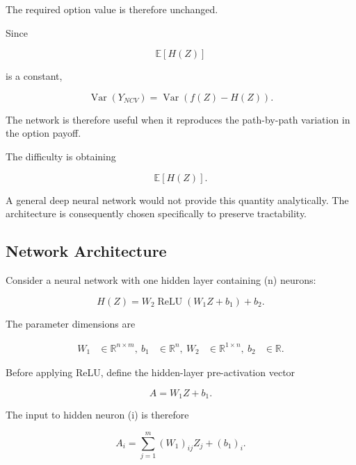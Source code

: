 \documentclass[12pt,a4paper]{report}
\begin{document}
The required option value is therefore unchanged.

Since

\begin{equation}
\mathbb{E}[H(Z)]
\end{equation}

is a constant,

\begin{equation}
\operatorname{Var}(Y_{NCV})
=
\operatorname{Var}
\left(
f(Z)-H(Z)
\right).
\end{equation}

The network is therefore useful when it reproduces the path-by-path variation in the option payoff.

The difficulty is obtaining

\begin{equation}
\mathbb{E}[H(Z)].
\end{equation}

A general deep neural network would not provide this quantity analytically. The architecture is consequently chosen specifically to preserve tractability.

\subsection{Network Architecture}

Consider a neural network with one hidden layer containing (n) neurons:

\begin{equation}
H(Z)
=
W_2
\operatorname{ReLU}
(W_1Z+b_1)
+
b_2.
\end{equation}

The parameter dimensions are

\begin{align}
W_1 &\in \mathbb{R}^{n\times m},\
b_1 &\in \mathbb{R}^{n},\
W_2 &\in \mathbb{R}^{1\times n},\
b_2 &\in \mathbb{R}.
\end{align}

Before applying ReLU, define the hidden-layer pre-activation vector

\begin{equation}
A
=
W_1Z+b_1.
\end{equation}

The input to hidden neuron (i) is therefore

\begin{equation}
A_i
=
\sum_{j=1}^{m}
(W_1)_{ij}Z_j
+
(b_1)_i.
\end{equation}
\end{document}
